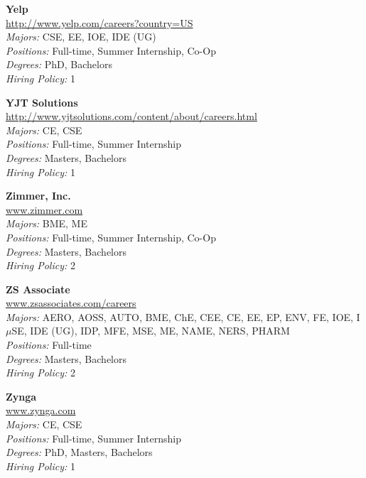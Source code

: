\documentclass{article}
\begin{document}
\begin{center}
\begin{multicols}{3}
\begin{minipage}{.9\columnwidth}{\Large\bf Yelp }\\
	\url{http://www.yelp.com/careers?country=US}\\
	\emph{Majors:} CSE, EE, IOE, IDE (UG)\\
	\emph{Positions:} Full-time, Summer Internship, Co-Op\\
	\emph{Degrees:} PhD, Bachelors\\
	\emph{Hiring Policy:} 1\\
\end{minipage}
 
\begin{minipage}{.9\columnwidth}{\Large\bf YJT Solutions }\\
	\url{http://www.yjtsolutions.com/content/about/careers.html}\\
	\emph{Majors:} CE, CSE\\
	\emph{Positions:} Full-time, Summer Internship\\
	\emph{Degrees:} Masters, Bachelors\\
	\emph{Hiring Policy:} 1\\
\end{minipage}
 
\begin{minipage}{.9\columnwidth}{\Large\bf Zimmer, Inc. }\\
	\url{www.zimmer.com}\\
	\emph{Majors:} BME, ME\\
	\emph{Positions:} Full-time, Summer Internship, Co-Op\\
	\emph{Degrees:} Masters, Bachelors\\
	\emph{Hiring Policy:} 2\\
\end{minipage}
 
\begin{minipage}{.9\columnwidth}{\Large\bf ZS Associate }\\
	\url{www.zsassociates.com/careers}\\
	\emph{Majors:} AERO, AOSS, AUTO, BME, ChE, CEE, CE, EE, EP, ENV, FE, IOE, I$\mu$SE, IDE (UG), IDP, MFE, MSE, ME, NAME, NERS, PHARM\\
	\emph{Positions:} Full-time\\
	\emph{Degrees:} Masters, Bachelors\\
	\emph{Hiring Policy:} 2\\
\end{minipage}
 
\begin{minipage}{.9\columnwidth}{\Large\bf Zynga }\\
	\url{www.zynga.com}\\
	\emph{Majors:} CE, CSE\\
	\emph{Positions:} Full-time, Summer Internship\\
	\emph{Degrees:} PhD, Masters, Bachelors\\
	\emph{Hiring Policy:} 1\\
\end{minipage}
 

\end{multicols}
\end{center}
\end{document}
